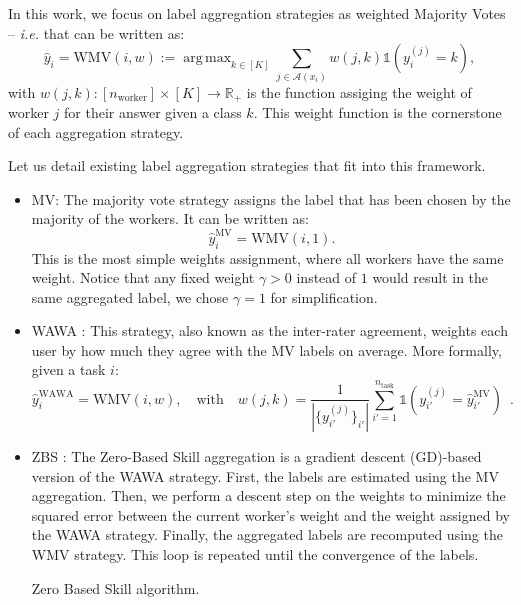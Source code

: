 \documentclass{cap2024}
\DeclareMathOperator*{\argmax}{arg\,max}
\begin{document}
In this work, we focus on label aggregation strategies as weighted Majority Votes \citep{littlestone1994weighted} -- \emph{i.e.} that can be written as:
\begin{equation}
  \label{eq:wmv_general}
  \hat{y}_i = \text{WMV}(i, w):=\argmax_{k \in [K]} \sum_{j\in\mathcal{A}(x_i)} w(j,k) \mathds{1}(y_i^{(j)} = k),
\end{equation}
with $w(j,k): [n_\text{worker}]\times [K]\rightarrow \mathbb{R}_+$ is the function assiging the weight of worker $j$ for their answer given a class $k$. This weight function is the cornerstone of each aggregation strategy.

Let us detail existing label aggregation strategies that fit into this framework.
\begin{itemize}
  \item MV: The majority vote strategy assigns the label that has been chosen by the majority of the workers. It can be written as:
    \begin{equation}
      \label{eq:mv}
      \hat{y}_i^{\text{MV}} = \mathrm{WMV}(i, 1).
    \end{equation}
    This is the most simple weights assignment, where all workers have the same weight. Notice that any fixed weight $\gamma>0$ instead of $1$ would result in the same aggregated label, we chose $\gamma=1$ for simplification.
    \item WAWA \citep{appen_wawa_2021}: This strategy, also known as the inter-rater agreement, weights each user by how much they agree with the MV labels on average. More formally, given a task $i$:
    \begin{equation}
      \hat{y}_i^\text{WAWA}= \mathrm{WMV}\left(i, w\right),\quad
      \text{with}\quad w(j, k) = \frac{1}{|\{y_{i'}^{(j)}\}_{i'}|} \sum_{i'=1}^{n_{\mathrm{task}}} \mathds{1}\left(y_{i'}^{(j)} = \hat{y}_{i'}^\text{MV}\right)\enspace.
    \end{equation}
    \item ZBS \citep{CrowdKit2023}: The Zero-Based Skill aggregation is a gradient descent (GD)-based version of the WAWA strategy.
    First, the labels are estimated using the MV aggregation. Then, we perform a descent step on the weights to minimize the squared error between the current worker's weight and the weight assigned by the WAWA strategy. Finally, the aggregated labels are recomputed using the WMV strategy. This loop is repeated until the convergence of the labels.
    \begin{algorithm}
      \caption{Zero Based Skill algorithm.}

\end{algorithm}
\end{itemize}
\end{document}
